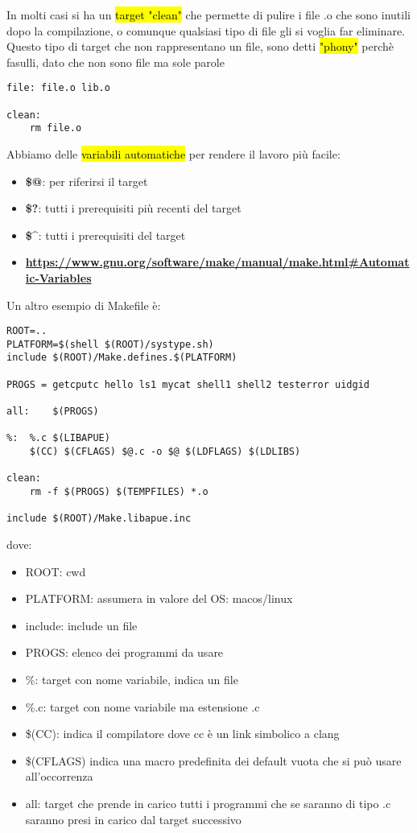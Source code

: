 In molti casi si ha un \hl{target "clean"} che permette di pulire i file .o che sono inutili dopo la compilazione, o comunque qualsiasi tipo di file gli si voglia far eliminare. Questo tipo di target che non rappresentano un file, sono detti \hl{"phony"} perchè fasulli, dato che non sono file ma sole parole

\begin{lstlisting}
file: file.o lib.o

clean:
	rm file.o
\end{lstlisting}

Abbiamo delle \hl{variabili automatiche} per rendere il lavoro più facile:

\begin{itemize}
	\item \textbf{\$@}: per riferirsi il target
	\item \textbf{\$?}: tutti i prerequisiti più recenti del target
	\item \textbf{\$\^}: tutti i prerequisiti del target
	\item \textbf{\url{https://www.gnu.org/software/make/manual/make.html#Automatic-Variables}}
\end{itemize}


Un altro esempio di Makefile è:

\begin{lstlisting}
ROOT=..
PLATFORM=$(shell $(ROOT)/systype.sh)
include $(ROOT)/Make.defines.$(PLATFORM)

PROGS =	getcputc hello ls1 mycat shell1 shell2 testerror uidgid

all:	$(PROGS)

%:	%.c $(LIBAPUE)
	$(CC) $(CFLAGS) $@.c -o $@ $(LDFLAGS) $(LDLIBS)

clean:
	rm -f $(PROGS) $(TEMPFILES) *.o

include $(ROOT)/Make.libapue.inc
\end{lstlisting}

dove:

\begin{itemize}
	\item ROOT: cwd
	\item PLATFORM: assumera in valore del OS: macos/linux
	\item include: include un file
	\item PROGS: elenco dei programmi da usare
	\item \%: target con nome variabile, indica un file
	\item \%.c: target con nome variabile ma estensione .c
	\item \$(CC): indica il compilatore dove cc è un link simbolico a clang
	\item \$(CFLAGS) indica una macro predefinita dei default vuota che si può usare all'occorrenza
	\item all: target che prende in carico tutti i programmi che se saranno di tipo .c saranno presi in carico dal target successivo
\end{itemize}


